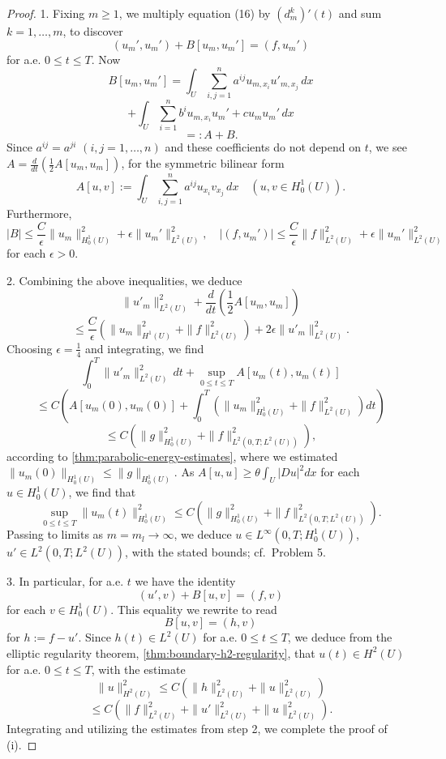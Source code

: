 \begin{proof}
1. Fixing $m \geq 1$, we multiply equation (16) by $(d_m^k)'(t)$ and sum $k = 1, \ldots, m$, to discover
\[
(u_m', u_m') + B[u_m, u_m'] = (f, u_m')
\]
for a.e. $0 \leq t \leq T$. Now
\[
B[u_m, u_m'] = \int_U \sum_{i,j=1}^n a^{ij} u_{m,x_i} u'_{m,x_j} \, dx
\]
\[
+ \int_U \sum_{i=1}^n b^i u_{m,x_i} u_m' + c u_m u_m' \, dx
\]
\[
=: A + B.
\]
Since $a^{ij} = a^{ji}$ $(i,j = 1, \ldots, n)$ and these coefficients do not depend on $t$, we see $A = \frac{d}{dt}\left(\frac{1}{2}A[u_m, u_m]\right)$, for the symmetric bilinear form
\[
A[u, v] := \int_U \sum_{i,j=1}^n a^{ij} u_{x_i} v_{x_j} \, dx \quad (u, v \in H_0^1(U)).
\]
Furthermore,
\[
|B| \leq \frac{C}{\epsilon}\|u_m\|_{H_0^1(U)}^2 + \epsilon\|u_m'\|_{L^2(U)}^2, \quad |(f, u_m')| \leq \frac{C}{\epsilon}\|f\|_{L^2(U)}^2 + \epsilon\|u_m'\|_{L^2(U)}^2
\]
for each $\epsilon > 0$.

2. Combining the above inequalities, we deduce
\[
\|u'_m\|^2_{L^2(U)} + \frac{d}{dt}\left(\frac{1}{2}A[u_m, u_m]\right)
\]
\[
\leq \frac{C}{\epsilon}(\|u_m\|^2_{H^1(U)} + \|f\|^2_{L^2(U)}) + 2\epsilon\|u'_m\|^2_{L^2(U)}.
\]
Choosing $\epsilon = \frac{1}{4}$ and integrating, we find
\[
\int_0^T \|u'_m\|^2_{L^2(U)} \, dt + \sup_{0 \le t \le T} A[u_m(t), u_m(t)]
\]
\[
\leq C\left(A[u_m(0), u_m(0)] + \int_0^T \left(\|u_m\|^2_{H^1_0(U)} + \|f\|^2_{L^2(U)}\right) dt\right)
\]
\[
\leq C\left(\|g\|^2_{H^1_0(U)} + \|f\|^2_{L^2(0,T;L^2(U))}\right),
\]
according to \cref{thm:parabolic-energy-estimates}, where we estimated $\|u_m(0)\|_{H^1_0(U)} \leq \|g\|_{H^1_0(U)}$. As $A[u,u] \geq \theta \int_U |Du|^2 dx$ for each $u \in H^1_0(U)$, we find that
\[
\sup_{0 \le t \le T} \|u_m(t)\|^2_{H^1_0(U)} \leq C\left(\|g\|^2_{H^1_0(U)} + \|f\|^2_{L^2(0,T;L^2(U))}\right).
\tag{48}
\]
Passing to limits as $m = m_l \to \infty$, we deduce $u \in L^\infty(0,T;H^1_0(U))$, $u' \in L^2(0,T;L^2(U))$, with the stated bounds; cf.\ Problem 5.

3. In particular, for a.e. $t$ we have the identity
\[
(u', v) + B[u, v] = (f, v)
\]
for each $v \in H^1_0(U)$. This equality we rewrite to read
\[
B[u, v] = (h, v)
\]
for $h := f - u'$. Since $h(t) \in L^2(U)$ for a.e. $0 \le t \le T$, we deduce from the elliptic regularity theorem, \cref{thm:boundary-h2-regularity}, that $u(t) \in H^2(U)$ for a.e. $0 \le t \le T$, with the estimate
\[
\|u\|^2_{H^2(U)} \leq C(\|h\|^2_{L^2(U)} + \|u\|^2_{L^2(U)})
\]
\[
\leq C(\|f\|^2_{L^2(U)} + \|u'\|^2_{L^2(U)} + \|u\|^2_{L^2(U)}).
\tag{49}
\]
Integrating and utilizing the estimates from step 2, we complete the proof of (i).


\end{proof}
